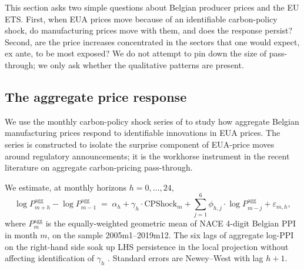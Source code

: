 %
%

This section asks two simple questions about Belgian producer prices and the EU ETS. First, when EUA prices move because of an identifiable carbon-policy shock, do manufacturing prices move with them, and does the response persist? Second, are the price increases concentrated in the sectors that one would expect, ex ante, to be most exposed? We do not attempt to pin down the size of pass-through; we only ask whether the qualitative patterns are present.

\subsection{The aggregate price response}\label{sec:passthrough:agg}

We use the monthly carbon-policy shock series of \citet{kanzig2023unequal} to study how aggregate Belgian manufacturing prices respond to identifiable innovations in EUA prices. The series is constructed to isolate the surprise component of EUA-price moves around regulatory announcements; it is the workhorse instrument in the recent literature on aggregate carbon-pricing pass-through.

We estimate, at monthly horizons $h = 0, \dots, 24$,
\begin{equation}
    \log P^{\text{agg}}_{m+h} - \log P^{\text{agg}}_{m-1} \;=\; \alpha_h + \gamma_h \cdot \text{CPShock}_m + \sum_{j=1}^{6} \phi_{h,j} \cdot \log P^{\text{agg}}_{m-j} + \varepsilon_{m, h},
    \label{eq:agg_lp}
\end{equation}
where $P^{\text{agg}}_m$ is the equally-weighted geometric mean of NACE 4-digit Belgian PPI in month $m$, on the sample 2005m1--2019m12. The six lags of aggregate log-PPI on the right-hand side soak up LHS persistence in the local projection without affecting identification of $\gamma_h$ \citep[][Plagborg-M\o ller--Wolf augmentation]{oleaplagborgmoller2019}. Standard errors are Newey--West with lag $h+1$.

